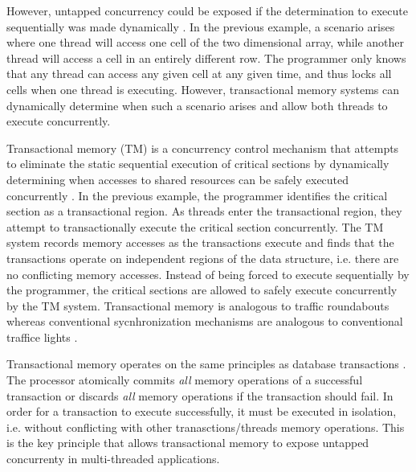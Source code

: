 \documentclass[a4paper]{article}
\begin{document}
\indent
However, untapped concurrency could be exposed if the determination to execute
sequentially was made dynamically \cite{intel_prog_ref}.  In the previous
example, a scenario arises where one thread will access one cell of the two
dimensional array, while another thread will access a cell in an entirely
different row.  The programmer only knows that any thread can access any given
cell at any given time, and thus locks all cells when one thread is executing.
However, transactional memory systems can dynamically determine when such a
scenario arises and allow both threads to execute concurrently.
\par

\indent
Transactional memory (TM) is a concurrency control mechanism that
attempts to eliminate the static sequential execution of critical sections by
dynamically determining when accesses to shared resources can be safely executed
concurrently \cite{sle_rajwar}.  In the previous example, the programmer
identifies the critical section as a transactional region.  As threads enter the
transactional region, they attempt to transactionally execute the critical
section concurrently.  The TM system records memory accesses as the transactions
execute and finds that the transactions operate on independent regions of the
data structure, i.e. there are no conflicting memory accesses.  Instead of being
forced to execute sequentially by the programmer, the critical sections are
allowed to safely execute concurrently by the TM system.  Transactional memory
is analogous to traffic roundabouts whereas conventional sycnhronization
mechanisms are analogous to conventional traffice lights \cite{neuling_vid}.
\par

\indent 
Transactional memory operates on the same principles as database
transactions \cite{tm_2nd}.  The processor atomically commits \textit{all}
memory operations of a successful transaction or discards \textit{all} memory
operations if the transaction should fail.  In order for a transaction to execute
successfully, it must be executed in isolation, i.e. without conflicting with
other tranasctions/threads memory operations.  This is the key principle that
allows transactional memory to expose untapped concurrenty in multi-threaded
applications.
\par 
\end{document}
